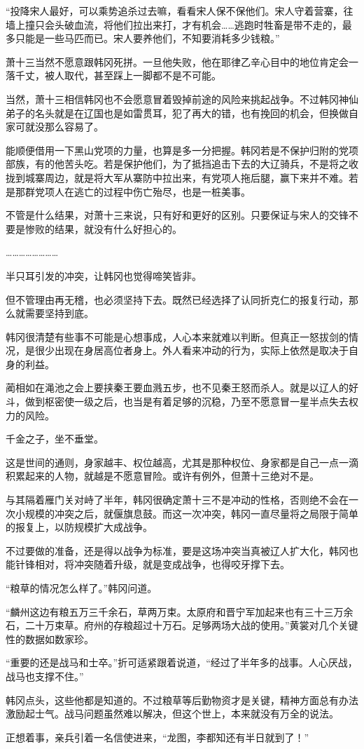 “投降宋人最好，可以乘势追杀过去嘛，看看宋人保不保他们。宋人守着营寨，往墙上撞只会头破血流，将他们拉出来打，才有机会……逃跑时牲畜是带不走的，最多只能是一些马匹而已。宋人要养他们，不知要消耗多少钱粮。”

萧十三当然不愿意跟韩冈死拼。一旦他失败，他在耶律乙辛心目中的地位肯定会一落千丈，被人取代，甚至踩上一脚都不是不可能。

当然，萧十三相信韩冈也不会愿意冒着毁掉前途的风险来挑起战争。不过韩冈神仙弟子的名头就是在辽国也是如雷贯耳，犯了再大的错，也有挽回的机会，但换做自家可就没那么容易了。

能顺便借用一下黑山党项的力量，也算是多一分把握。韩冈若是不保护归附的党项部族，有的他苦头吃。若是保护他们，为了抵挡追击下去的大辽骑兵，不是将之收拢到城寨周边，就是将大军从寨防中拉出来，有党项人拖后腿，赢下来并不难。若是那群党项人在逃亡的过程中伤亡殆尽，也是一桩美事。

不管是什么结果，对萧十三来说，只有好和更好的区别。只要保证与宋人的交锋不要是惨败的结果，就没有什么好担心的。

……………………

半只耳引发的冲突，让韩冈也觉得啼笑皆非。

但不管理由再无稽，也必须坚持下去。既然已经选择了认同折克仁的报复行动，那么就需要坚持到底。

韩冈很清楚有些事不可能是心想事成，人心本来就难以判断。但真正一怒拔剑的情况，是很少出现在身居高位者身上。外人看来冲动的行为，实际上依然是取决于自身的利益。

蔺相如在渑池之会上要挟秦王要血溅五步，也不见秦王怒而杀人。就是以辽人的好斗，做到枢密使一级之后，也当是有着足够的沉稳，乃至不愿意冒一星半点失去权力的风险。

千金之子，坐不垂堂。

这是世间的通则，身家越丰、权位越高，尤其是那种权位、身家都是自己一点一滴积累起来的人物，就越是不愿意冒险。或许有例外，但萧十三绝对不是。

与其隔着雁门关对峙了半年，韩冈很确定萧十三不是冲动的性格，否则绝不会在一次小规模的冲突之后，就偃旗息鼓。而这一次冲突，韩冈一直尽量将之局限于简单的报复上，以防规模扩大成战争。

不过要做的准备，还是得以战争为标准，要是这场冲突当真被辽人扩大化，韩冈也能针锋相对，将冲突随着升级，就是变成战争，也得咬牙撑下去。

“粮草的情况怎么样了。”韩冈问道。

“麟州这边有粮五万三千余石，草两万束。太原府和晋宁军加起来也有三十三万余石，二十万束草。府州的存粮超过十万石。足够两场大战的使用。”黄裳对几个关键性的数据如数家珍。

“重要的还是战马和士卒。”折可适紧跟着说道，“经过了半年多的战事。人心厌战，战马也支撑不住。”

韩冈点头，这些他都是知道的。不过粮草等后勤物资才是关键，精神方面总有办法激励起士气。战马问题虽然难以解决，但这个世上，本来就没有万全的说法。

正想着事，亲兵引着一名信使进来，“龙图，李都知还有半日就到了！”

